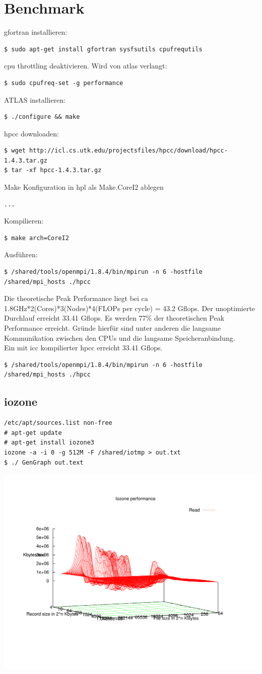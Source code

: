\chapter{Benchmark}
gfortran installieren:
\begin{lstlisting}[style=Bash]
$ sudo apt-get install gfortran sysfsutils cpufrequtils
\end{lstlisting}
cpu throttling deaktivieren. Wird von atlas verlangt:
\begin{lstlisting}[style=Bash]
$ sudo cpufreq-set -g performance
\end{lstlisting}
ATLAS installieren:
\begin{lstlisting}[style=Bash]
$ ./configure && make
\end{lstlisting}
hpcc downloaden:
\begin{lstlisting}[style=Bash]
$ wget http://icl.cs.utk.edu/projectsfiles/hpcc/download/hpcc-1.4.3.tar.gz
$ tar -xf hpcc-1.4.3.tar.gz
\end{lstlisting}
Make Konfiguration in hpl als Make.CoreI2 ablegen
\begin{lstlisting}[style=Bash]
...
\end{lstlisting}
Kompilieren:
\begin{lstlisting}[style=Bash]
$ make arch=CoreI2
\end{lstlisting}
Ausführen:
\begin{lstlisting}[style=Bash]
$ /shared/tools/openmpi/1.8.4/bin/mpirun -n 6 -hostfile /shared/mpi_hosts ./hpcc
\end{lstlisting}
Die theoretische Peak Performance liegt bei ca 1.8GHz*2(Cores)*3(Nodes)*4(FLOPs per cycle) = 43.2 Gflops.
Der unoptimierte Durchlauf erreicht 33.41 Gflops. Es werden 77\% der theoretischen Peak Performance erreicht.
Gründe hierfür sind unter anderen die langsame Kommunikation zwischen den CPUs und die langsame Speicheranbindung.\\
Ein mit icc kompilierter hpcc erreicht 33.41 Gflops.
\begin{lstlisting}[style=Bash]
$ /shared/tools/openmpi/1.8.4/bin/mpirun -n 6 -hostfile /shared/mpi_hosts ./hpcc
\end{lstlisting}
\section{iozone}
\begin{lstlisting}[style=Bash]
/etc/apt/sources.list non-free
# apt-get update
# apt-get install iozone3
iozone -a -i 0 -g 512M -F /shared/iotmp > out.txt
$ ./ GenGraph out.text
\end{lstlisting}
\includegraphics{read.pdf}

